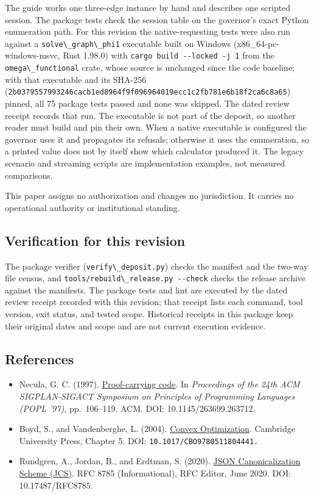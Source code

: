 \documentclass[
  11pt,
]{article}
\newcommand{\passthrough}[1]{#1}
\providecommand{\tightlist}{%
  \setlength{\itemsep}{0pt}\setlength{\parskip}{0pt}}
\begin{document}
The guide works one three-edge instance by hand and describes one
scripted session. The package tests check the session table on the
governor's exact Python enumeration path. For this revision the
native-requesting tests were also run against a
\passthrough{\lstinline!solve\_graph\_phi1!} executable built on Windows
(x86\_64-pc-windows-msvc, Rust 1.98.0) with
\passthrough{\lstinline!cargo build --locked -j 1!} from the
\passthrough{\lstinline!omega\_functional!} crate, whose source is
unchanged since the code baseline; with that executable and its SHA-256
(\nolinkurl{2b0379557993246cacb1ed8964f9f096964019ecc1c2fb781e6b18f2ca6c8a65})
pinned, all 75 package tests passed and none was skipped. The dated
review receipt records that run. The executable is not part of the
deposit, so another reader must build and pin their own. When a native
executable is configured the governor uses it and propagates its
refusals; otherwise it uses the enumeration, so a printed value does not
by itself show which calculator produced it. The legacy scenario and
streaming scripts are implementation examples, not measured comparisons.

This paper assigns no authorization and changes no jurisdiction. It
carries no operational authority or institutional standing.

\subsection{Verification for this
revision}\label{verification-for-this-revision}

The package verifier (\passthrough{\lstinline!verify\_deposit.py!})
checks the manifest and the two-way file census, and
\passthrough{\lstinline!tools/rebuild\_release.py --check!} checks the
release archive against the manifests. The package tests and lint are
executed by the dated review receipt recorded with this revision; that
receipt lists each command, tool version, exit status, and tested scope.
Historical receipts in this package keep their original dates and scope
and are not current execution evidence.

\subsection{References}\label{references}

\begin{itemize}
\tightlist
\item
  Necula, G. C. (1997).
  \href{https://doi.org/10.1145/263699.263712}{Proof-carrying code}. In
  \emph{Proceedings of the 24th ACM SIGPLAN-SIGACT Symposium on
  Principles of Programming Languages (POPL '97)}, pp.~106--119. ACM.
  DOI: 10.1145/263699.263712.
\item
  Boyd, S., and Vandenberghe, L. (2004).
  \href{https://doi.org/10.1017/CBO9780511804441}{Convex Optimization}.
  Cambridge University Press, Chapter 5. DOI:
  \nolinkurl{10.1017/CBO9780511804441.}
\item
  Rundgren, A., Jordan, B., and Erdtman, S. (2020).
  \href{https://www.rfc-editor.org/rfc/rfc8785}{JSON Canonicalization
  Scheme (JCS)}. RFC 8785 (Informational), RFC Editor, June 2020. DOI:
  10.17487/RFC8785.
\end{itemize}
\end{document}
